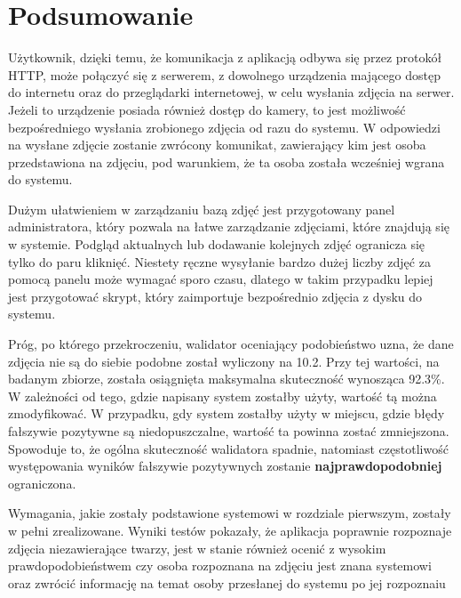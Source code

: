 \chapter*{Podsumowanie}

Użytkownik, dzięki temu, że komunikacja z aplikacją odbywa się przez protokół HTTP,
może połączyć się z serwerem, z dowolnego urządzenia mającego dostęp do internetu oraz do przeglądarki
internetowej, w celu wysłania zdjęcia na serwer.
Jeżeli to urządzenie posiada również dostęp do kamery, to jest
możliwość bezpośredniego wysłania zrobionego zdjęcia od razu do systemu.
W odpowiedzi na wysłane zdjęcie zostanie zwrócony komunikat, zawierający kim jest osoba przedstawiona na zdjęciu,
pod warunkiem, że ta osoba została wcześniej wgrana do systemu.

Dużym ułatwieniem w zarządzaniu bazą zdjęć jest przygotowany panel administratora,
który pozwala na łatwe zarządzanie zdjęciami, które znajdują się w systemie.
Podgląd aktualnych lub dodawanie kolejnych zdjęć ogranicza się tylko do paru kliknięć.
Niestety ręczne wysyłanie bardzo dużej liczby zdjęć za pomocą panelu może wymagać sporo czasu,
dlatego w takim przypadku lepiej jest przygotować skrypt, który zaimportuje bezpośrednio zdjęcia z dysku do systemu.

Próg, po którego przekroczeniu, walidator oceniający podobieństwo uzna,
że dane zdjęcia nie są do siebie podobne został wyliczony na \num{10.2}.
Przy tej wartości, na badanym zbiorze, została osiągnięta maksymalna skuteczność wynosząca \num{92.3}\%.
W zależności od tego, gdzie napisany system zostałby użyty, wartość tą można zmodyfikować.
W przypadku, gdy system zostałby użyty w miejscu, gdzie błędy fałszywie pozytywne są niedopuszczalne,
wartość ta powinna zostać zmniejszona.
Spowoduje to, że ogólna skuteczność walidatora spadnie, natomiast częstotliwość występowania wyników fałszywie
pozytywnych zostanie \textbf{najprawdopodobniej} ograniczona.

Wymagania, jakie zostały podstawione systemowi w rozdziale pierwszym, zostały w pełni zrealizowane.
Wyniki testów pokazały, że aplikacja poprawnie rozpoznaje zdjęcia niezawierające twarzy,
jest w stanie również ocenić z wysokim prawdopodobieństwem czy osoba rozpoznana na zdjęciu jest znana systemowi
oraz zwrócić informację na temat osoby przesłanej do systemu po jej rozpoznaiu
